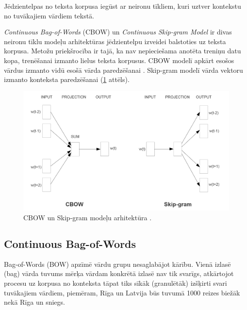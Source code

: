 Jēdzientelpas no teksta korpusa iegūst ar neironu tīkliem, kuri uztver kontekstu no tuvākajiem vārdiem tekstā.

\textit{Continuous Bag-of-Words} (CBOW) un \textit{Continuous Skip-gram Model} ir divas neironu tīklu modeļu arhitektūras jēdzientelpu izveidei balstoties uz teksta korpusa. Metožu priekšrocība ir tajā, ka nav nepieciešama anotēta treniņu datu kopa, trenēšanai izmanto lielus teksta korpusus. CBOW modelī apkārt esošos vārdus izmanto vidū esošā vārda paredzēšanai \cite{word2vec2013}. Skip-gram modelī vārda vektoru izmanto konteksta paredzēšanai (\ref{fig:cbow-skipgram} attēls).

\begin{figure}[h]
	\centering
	\includegraphics[width=\textwidth]{figures/word2vec-models.png}
	\caption{CBOW un Skip-gram modeļu arhitektūra \cite{word2vec2013}.}
	\label{fig:cbow-skipgram}
\end{figure}







\subsection{Continuous Bag-of-Words}

Bag-of-Words (BOW) apzīmē vārdu grupu nesaglabājot kārību. Vienā izlasē (bag) vārda tuvums mērķa vārdam konkrētā izlasē nav tik svarīgs, atkārtojot procesu uz korpusa no konteksta tāpat tiks sīkāk (granulētāk) izšķirti svari tuvākajiem vārdiem, piemēram, Rīga un Latvija būs tuvumā 1000 reizes biežāk nekā Rīga un sniegs.

